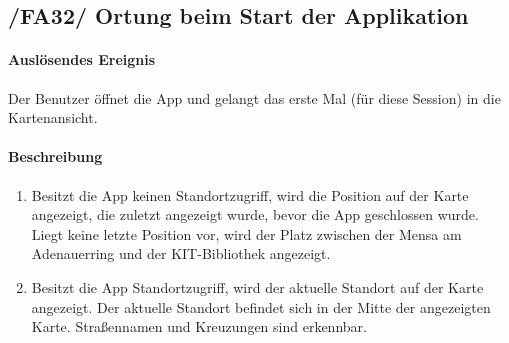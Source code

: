 \subsection*{/FA32/ Ortung beim Start der Applikation}
\label{/FA32/}
\paragraph{Auslösendes Ereignis}
Der \Gls{Benutzer} öffnet die App und gelangt das erste Mal (für diese Session) in die \Gls{Kartenansicht}.
\paragraph{Beschreibung}
\begin{enumerate}
    \item Besitzt die App keinen Standortzugriff, wird die Position auf der \Gls{Karte} angezeigt, die zuletzt angezeigt wurde, bevor die App geschlossen wurde. Liegt keine letzte Position vor, wird der Platz zwischen der Mensa am Adenauerring und der \Gls{KIT}-Bibliothek angezeigt.
    \item Besitzt die App Standortzugriff, wird der aktuelle Standort auf der \Gls{Karte} angezeigt. Der aktuelle Standort befindet sich in der Mitte der angezeigten \Gls{Karte}. Straßennamen und Kreuzungen sind erkennbar.
\end{enumerate}